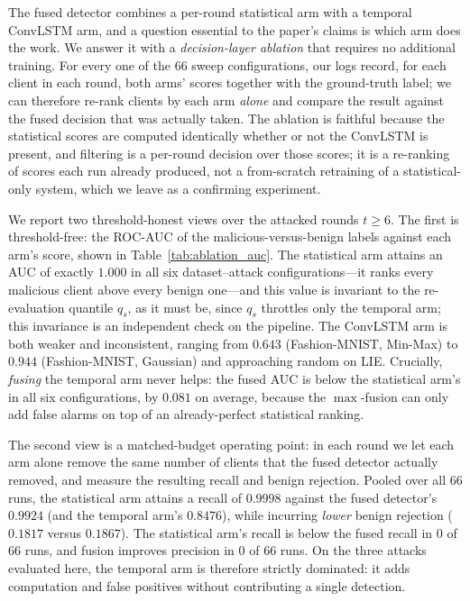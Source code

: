 \documentclass[journal]{IEEEtran}
\begin{document}
The fused detector combines a per-round statistical arm with a temporal ConvLSTM arm, and a question essential to the paper's claims is which arm does the work. We answer it with a \emph{decision-layer ablation} that requires no additional training. For every one of the $66$ sweep configurations, our logs record, for each client in each round, both arms' scores together with the ground-truth label; we can therefore re-rank clients by each arm \emph{alone} and compare the result against the fused decision that was actually taken. The ablation is faithful because the statistical scores are computed identically whether or not the ConvLSTM is present, and filtering is a per-round decision over those scores; it is a re-ranking of scores each run already produced, not a from-scratch retraining of a statistical-only system, which we leave as a confirming experiment.

We report two threshold-honest views over the attacked rounds $t \ge 6$. The first is threshold-free: the ROC-AUC of the malicious-versus-benign labels against each arm's score, shown in Table~\ref{tab:ablation_auc}. The statistical arm attains an AUC of exactly $1.000$ in all six dataset--attack configurations---it ranks every malicious client above every benign one---and this value is invariant to the re-evaluation quantile $q_s$, as it must be, since $q_s$ throttles only the temporal arm; this invariance is an independent check on the pipeline. The ConvLSTM arm is both weaker and inconsistent, ranging from $0.643$ (Fashion-MNIST, Min-Max) to $0.944$ (Fashion-MNIST, Gaussian) and approaching random on LIE. Crucially, \emph{fusing} the temporal arm never helps: the fused AUC is below the statistical arm's in all six configurations, by $0.081$ on average, because the $\max$-fusion can only add false alarms on top of an already-perfect statistical ranking.

The second view is a matched-budget operating point: in each round we let each arm alone remove the same number of clients that the fused detector actually removed, and measure the resulting recall and benign rejection. Pooled over all $66$ runs, the statistical arm attains a recall of $0.9998$ against the fused detector's $0.9924$ (and the temporal arm's $0.8476$), while incurring \emph{lower} benign rejection ($0.1817$ versus $0.1867$). The statistical arm's recall is below the fused recall in $0$ of $66$ runs, and fusion improves precision in $0$ of $66$ runs. On the three attacks evaluated here, the temporal arm is therefore strictly dominated: it adds computation and false positives without contributing a single detection.
\end{document}
